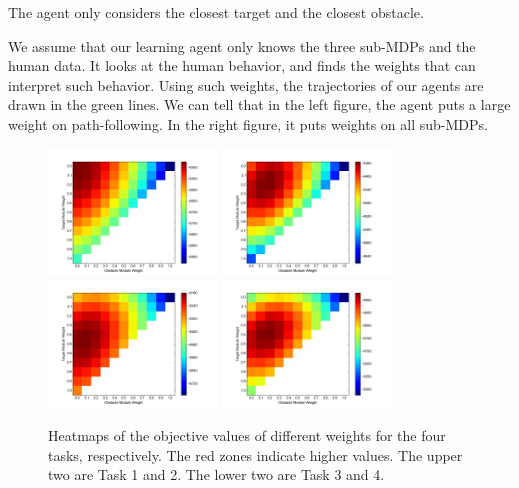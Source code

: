 \documentclass[11pt]{article} %
\begin{document}
The agent only considers the closest target and the closest obstacle.

We assume that our learning agent only knows the three sub-MDPs and the human
data. It looks at the human behavior, and finds the weights that can interpret
such behavior. 
Using such weights, the trajectories of our agents are drawn in the green lines.
We can tell that in the left figure, the agent puts a large weight on
path-following.  In the right figure, it puts weights on all sub-MDPs.

\begin{figure}[h!]
\centering
\includegraphics[width=0.4\textwidth]{objValuesTask1.png}
\includegraphics[width=0.4\textwidth]{objValuesTask2.png}
\includegraphics[width=0.4\textwidth]{objValuesTask3.png}
\includegraphics[width=0.4\textwidth]{objValuesTask4.png}
\caption{Heatmaps of the objective values of different weights for the four
tasks, respectively. The red zones indicate higher values. The upper two are
Task 1 and 2. The lower two are Task 3 and 4.}
\label{fig:heatmap}
\end{figure}
\end{document}
